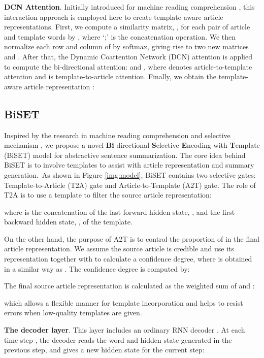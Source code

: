\documentclass[11pt,a4paper]{article}
\begin{document}
\begin{spacing}{1.0}
\noindent\textbf{DCN Attention}. Initially introduced for machine reading comprehension \cite{seo2016bidirectional}, this interaction approach is employed here to create template-aware article representations. First, we compute a similarity matrix, , for each pair of article and template words by , where `;' is the concatenation operation. We then normalize each row and column of  by softmax, giving rise to two new matrices  and . After that, the Dynamic Coattention Network (DCN) attention is applied to compute the bi-directional attention:  and , where  denotes article-to-template attention and  is template-to-article attention. Finally, we obtain the template-aware article representation :


\subsection{BiSET}
Inspired by the research in machine reading comprehension \cite{seo2016bidirectional} and selective mechanism \cite{Zhou2017Selective}, we propose a novel \textbf{Bi}-directional \textbf{S}elective \textbf{E}ncoding with \textbf{T}emplate (BiSET) model for abstractive sentence summarization. The core idea behind BiSET is to involve templates to assist with article representation and summary generation.~As shown in Figure \ref{img:model}, BiSET contains two selective gates: Template-to-Article (T2A) gate and Article-to-Template (A2T) gate. The role of T2A is to use a template to filter the source article representation:

where  is the concatenation of the last forward hidden state, , and the first backward hidden state, , of the template.

On the other hand, the purpose of A2T is to control the proportion of  in the final article representation. We assume the source article is credible and use its representation  together with  to calculate a confidence degree, where  is obtained in a similar way as . The confidence degree  is computed by:

The final source article representation is calculated as the weighted sum of  and :

which allows a flexible manner for template incorporation and helps to resist errors when low-quality templates are given.

\noindent\textbf{The decoder layer}. This layer includes an ordinary RNN decoder \cite{Luong2015Effective}. At each time step , the decoder reads the word  and hidden state  generated in the previous step, and gives a new hidden state for the current step:


\end{spacing}
\end{document}
